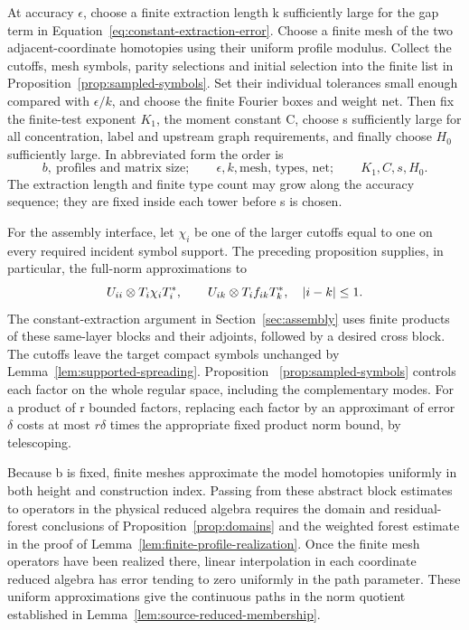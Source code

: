 At accuracy \(\epsilon\), choose a finite extraction length k sufficiently
large for the gap term in Equation~\eqref{eq:constant-extraction-error}.
Choose a finite mesh of the
two adjacent-coordinate homotopies using their uniform profile modulus.
Collect the cutoffs, mesh symbols, parity selections and initial selection
into the finite list in Proposition~\ref{prop:sampled-symbols}.  Set their
individual tolerances small enough compared with \(\epsilon/k\), and choose
the finite Fourier boxes and weight net.  Then fix the finite-test exponent
\(K_1\), the moment constant C, choose s sufficiently large for all
concentration, label and upstream graph requirements, and finally choose
\(H_0\) sufficiently large.  In abbreviated form the order is
\[
 b,\ \text{profiles and matrix size};\qquad
 \epsilon,k,\text{mesh, types, net};\qquad
 K_1,C,s,H_0.
\]
The extraction length and finite type count may grow along the accuracy
sequence; they are fixed inside each tower before s is chosen.

For the assembly interface, let \(\chi_i\) be one of the larger cutoffs equal
to one on every required incident symbol support.  The preceding proposition
supplies, in particular, the full-norm approximations to
\[
 U_{ii}\otimes T_i\chi_iT_i^*,\qquad
 U_{ik}\otimes T_if_{ik}T_k^*,\quad\left\lvert i-k\right\rvert\leq1.
\]
The constant-extraction argument in Section~\ref{sec:assembly} uses finite
products of these same-layer blocks and their adjoints, followed by a desired
cross block.  The cutoffs leave the target compact
symbols unchanged by Lemma~\ref{lem:supported-spreading}.  Proposition~
\ref{prop:sampled-symbols} controls each factor on the whole regular space,
including the complementary modes.  For a product of r bounded factors,
replacing each factor by an approximant of error \(\delta\) costs at most
\(r\delta\) times the appropriate fixed product norm bound, by telescoping.

Because b is fixed, finite meshes approximate the model homotopies uniformly
in both height and construction index.  Passing from these abstract block
estimates to operators in the physical reduced algebra requires the domain
and residual-forest conclusions of
Proposition~\ref{prop:domains} and the weighted forest estimate in the
proof of Lemma~\ref{lem:finite-profile-realization}.  Once the finite mesh
operators have been realized there, linear interpolation in each coordinate
reduced algebra has error tending to zero uniformly in the path parameter.
These uniform approximations give the continuous paths in the norm quotient
established in Lemma~\ref{lem:source-reduced-membership}.
